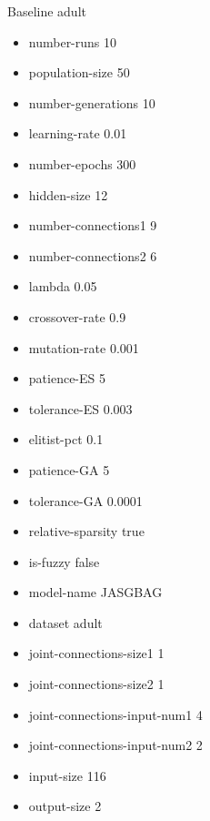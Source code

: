 Baseline
adult
\begin{itemize}
\item number-runs 10
\item population-size 50
\item number-generations 10
\item learning-rate 0.01
\item number-epochs 300
\item hidden-size 12
\item number-connections1 9
\item number-connections2 6
\item lambda 0.05
\item crossover-rate 0.9
\item mutation-rate 0.001
\item patience-ES 5
\item tolerance-ES 0.003
\item elitist-pct 0.1
\item patience-GA 5
\item tolerance-GA 0.0001
\item relative-sparsity true
\item is-fuzzy false
\item model-name JASGBAG
\item dataset adult
\item joint-connections-size1 1
\item joint-connections-size2 1
\item joint-connections-input-num1 4
\item joint-connections-input-num2 2
\item input-size 116
\item output-size 2
\end{itemize}

